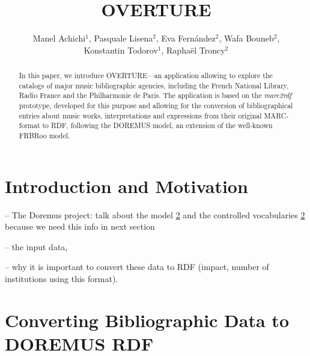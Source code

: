 \documentclass[runningheads,a4paper]{llncs}
\begin{document}
\title{OVERTURE}


\author{Manel Achichi$^1$, Pasquale Lisena$^2$, Eva Fern\'{a}ndez$^2$, Wafa Bouneb$^2$, \\ Konstantin Todorov$^1$, Rapha\"{e}l Troncy$^2$}

\maketitle


\begin{abstract}
In this paper, we introduce OVERTURE---an application allowing to explore the catalogs of major music bibliographic agencies, including the French National Library, Radio France and the Philharmonie de Paris. The application is based on the {\it marc2rdf} prototype, developed for this purpose and allowing for the conversion of bibliographical entries about music works, interpretations and expressions from their original MARC-format to RDF, following the DOREMUS model, an extension of the well-known FRBRoo model. 

\end{abstract}


\section{Introduction and Motivation}

-- The Doremus project: talk about the model \ref{} and the controlled vocabularies \ref{} because we need this info in next section

-- the input data, 

-- why it is important to convert these data to RDF (impact, number of institutions using this format).


\section{Converting Bibliographic Data to DOREMUS RDF}
\end{document}
